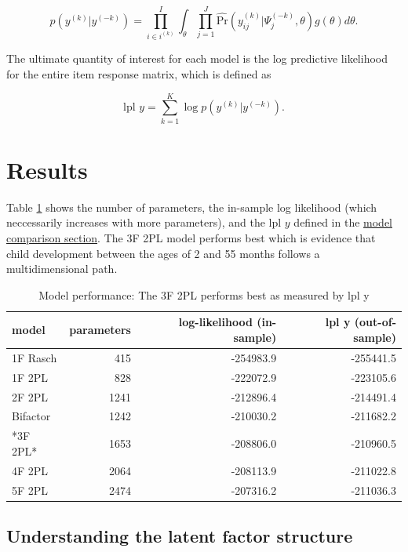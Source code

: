 \documentclass[10pt, letterpaper]{article}
\newenvironment{CodeChunk}{}{}
\begin{document}
\[
p(y^{(k)} | y^{(-k)}) = \prod_{i \in i^{(k)}}^{I} \int_\theta \prod_{j=1}^{J} \hat{\text{Pr}}(y_{ij}^{(k)} | \Psi_j^{(-k)}, \theta) g(\theta)d\theta.
\]

The ultimate quantity of interest for each model is the log predictive
likelihood for the entire item response matrix, which is defined as

\[
\text{lpl } y = \sum_{k = 1}^{K} \log p(y^{(k)} | y^{(-k)}).
\]

\hypertarget{results}{%
\section{Results}\label{results}}

Table \ref{tab:results} shows the number of parameters, the in-sample
log likelihood (which neccessarily increases with more parameters), and
the \(\text{lpl } y\) defined in the
\protect\hyperlink{modelcompare}{model comparison section}. The 3F 2PL
model performs best which is evidence that child development between the
ages of 2 and 55 months follows a multidimensional path.

\begin{CodeChunk}
\begin{table}[!h]

\caption{\label{tab:results}Model performance: The 3F 2PL performs best as measured by lpl y}
\centering
\fontsize{8}{10}\selectfont
\begin{tabular}[t]{l|r|r|r}
\hline
model & parameters & log-likelihood (in-sample) & lpl y (out-of-sample)\\
\hline
1F Rasch & 415 & -254983.9 & -255441.5\\
\hline
1F 2PL & 828 & -222072.9 & -223105.6\\
\hline
2F 2PL & 1241 & -212896.4 & -214491.4\\
\hline
Bifactor & 1242 & -210030.2 & -211682.2\\
\hline
*3F 2PL* & 1653 & -208806.0 & -210960.5\\
\hline
4F 2PL & 2064 & -208113.9 & -211022.8\\
\hline
5F 2PL & 2474 & -207316.2 & -211036.3\\
\hline
\end{tabular}
\end{table}

\end{CodeChunk}

\hypertarget{understanding-the-latent-factor-structure}{%
\subsection{Understanding the latent factor
structure}\label{understanding-the-latent-factor-structure}}
\end{document}
